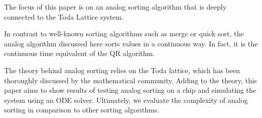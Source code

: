 The focus of this paper is on an analog sorting algorithm that is deeply connected to the Toda Lattice system.

In contrast to well-known sorting algorithms such as merge or quick sort, 
the analog algorithm discussed here sorts values in a continuous way. In fact, it is the continuous time equivalent of the QR algorithm. 

The theory behind analog sorting relies on the Toda lattice, which has been thoroughly discussed by the mathematical community. Adding to the theory, this paper aims to show results of testing analog sorting on a chip and simulating the system using an ODE solver. Ultimately, we evaluate the complexity of analog sorting in comparison to other sorting algorithms.
